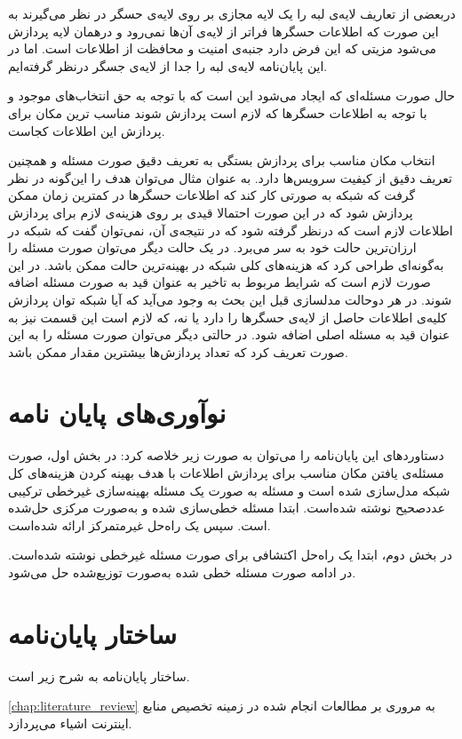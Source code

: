  دربعضی از تعاریف لایه‌ی لبه را یک لایه مجازی بر روی لایه‌ی حسگر در نظر می‌گیرند به این صورت که اطلاعات حسگرها فراتر از لایه‌ی آن‌ها نمی‌رود و درهمان لایه پردازش می‌شود مزیتی که این فرض دارد جنبه‌ی امنیت و محافظت از اطلاعات است. اما در این پایان‌نامه لایه‌ی لبه را جدا از لایه‌ی جسگر درنظر گرفته‌ایم. 
   
  حال صورت مسئله‌ای که ایجاد می‌شود این است که با توجه به حق انتخاب‌های موجود و با توجه به اطلاعات حسگرها که لازم است پردازش شوند مناسب ترین مکان برای پردازش این اطلاعات کجاست.
 
  انتخاب مکان مناسب برای پردازش بستگی به تعریف دقیق صورت مسئله و همچنین تعریف دقیق از کیفیت سرویس‌ها دارد. به عنوان مثال می‌توان هدف را این‌گونه در نظر گرفت که شبکه به صورتی کار کند که اطلاعات حسگرها در کمترین زمان ممکن پردازش شود که در این صورت احتمالا قیدی بر روی هزینه‌ی لازم برای پردازش اطلاعات لازم است که درنظر گرفته شود که در نتیجه‌ی آن، نمی‌توان گفت که شبکه در ارزان‌ترین حالت خود به سر می‌برد.
  در یک حالت دیگر می‌توان صورت مسئله را به‌گونه‌ای طراحی کرد که هزینه‌های کلی شبکه در بهینه‌ترین حالت ممکن باشد. در این صورت لازم است که شرایط مربوط به تاخیر به عنوان قید به صورت مسئله اضافه شوند. در هر دوحالت مدلسازی قبل این بحث به وجود می‌آید که آیا شبکه توان پردازش کلیه‌ی اطلاعات حاصل از لایه‌ی حسگرها را دارد یا نه، که لازم است این قسمت نیز به عنوان قید به مسئله اصلی اضافه شود.  در حالتی دیگر می‌توان صورت مسئله را به این صورت تعریف کرد که تعداد پردازش‌ها بیشترین مقدار ممکن باشد. 

  \section{نو‌آوری‌های پایان نامه}
    دستاورد‌های این پایان‌نامه را می‌توان به صورت زیر خلاصه کرد:
    در بخش اول، صورت مسئله‌ی یافتن مکان مناسب برای پردازش اطلاعات با هدف بهینه کردن هزینه‌های کل شبکه مدل‌سازی شده است و مسئله به صورت یک مسئله بهینه‌سازی غیرخطی ترکیبی عددصحیح نوشته شده‌است. ابتدا مسئله خطی‌سازی شده و به‌صورت مرکزی حل‌شده است. سپس یک راه‌حل غیرمتمرکز ارائه شده‌است. 

    در بخش دوم، ابتدا یک راه‌حل اکتشافی برای صورت مسئله غیرخطی نوشته شده‌است. در ادامه صورت مسئله‌ خطی شده به‌صورت توزیع‌شده حل‌ می‌شود.  


  \section{ساختار پایان‌نامه}
    ساختار پایان‌نامه به شرح زیر است.

    \cref{chap:literature_review} به مروری بر مطالعات انجام شده در زمینه تخصیص منابع اینترنت اشیاء می‌پردازد.
    
